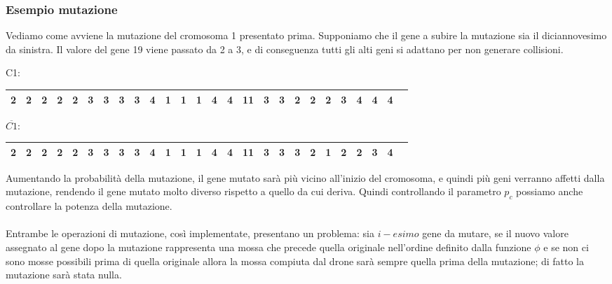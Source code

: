 \documentclass{article}
\begin{document}
\subsubsection{Esempio mutazione}
Vediamo come avviene la mutazione del cromosoma 1 presentato prima. Supponiamo che il gene a subire la mutazione sia il diciannovesimo da sinistra. Il valore del gene 19 viene passato da 2 a 3, e di conseguenza tutti gli alti geni si adattano per non generare collisioni.


\begin{center}
\begin{adjustbox}{width=\columnwidth,center}
   C1: \begin{tabular}{ | c | c | c | c | c | c | c | c| c | c | c | c | c | c | c | c| c | c | c | c | c | c | c | c | c | c | } 
  \hline
   2 & 2 & 2 & 2 & 2 & 3 & 3 &3&3&4&1&1&1&4&4&11&3&3&2&2&2&3&4&4&4\\
  \hline
\end{tabular}
\end{adjustbox}
\end{center}
\begin{center}
\begin{adjustbox}{width=\columnwidth,center}
   $\overline{C1}$: \begin{tabular}{ | c | c | c | c | c | c | c | c| c | c | c | c | c | c | c | c| c | c | c | c | c | c | c | c | c | c | } 
  \hline
   2 & 2 & 2 & 2 & 2 & 3 & 3 & 3 & 3 & 4 & 1 & 1 & 1 & 4 & 4 & 11 & 3 & 3 & \textbf{3} &\textbf 2 &\textbf 1 &\textbf 2 & \textbf2 & \textbf3 & \textbf4\\
  \hline
\end{tabular}
\end{adjustbox}
\end{center}

Aumentando la probabilità della mutazione, il gene mutato sarà più vicino all'inizio del cromosoma, e quindi più geni verranno affetti dalla mutazione, rendendo il gene mutato molto diverso rispetto a quello da cui deriva. Quindi controllando il parametro $p_c$ possiamo anche controllare la potenza della mutazione.

\paragraph{}
Entrambe le operazioni di mutazione, così implementate, presentano un problema: sia $i-esimo$ gene da mutare, se il nuovo valore assegnato al gene dopo la mutazione rappresenta una mossa che precede quella originale nell'ordine definito dalla funzione $\phi$ e se non ci sono mosse possibili prima di quella originale allora la mossa compiuta dal drone sarà sempre quella prima della mutazione; di fatto la mutazione sarà stata nulla.
\end{document}
